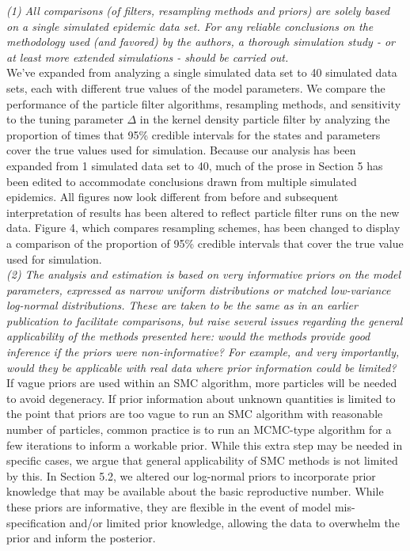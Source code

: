 \documentclass{article}
\begin{document}
\noindent \emph{(1) All comparisons (of filters, resampling methods and priors) are solely based on a single simulated epidemic data set. For any reliable conclusions on the methodology used (and favored) by the authors, a thorough simulation study - or at least more extended simulations - should be carried out.} \\

We've expanded from analyzing a single simulated data set to 40 simulated data sets, each with different true values of the model parameters. We compare the performance of the particle filter algorithms, resampling methods, and sensitivity to the tuning parameter $\Delta$ in the kernel density particle filter by analyzing the proportion of times that 95\% credible intervals for the states and parameters cover the true values used for simulation. Because our analysis has been expanded from 1 simulated data set to 40, much of the prose in Section 5 has been edited to accommodate conclusions drawn from multiple simulated epidemics. All figures now look different from before and subsequent interpretation of results has been altered to reflect particle filter runs on the new data. Figure 4, which compares resampling schemes, has been changed to display a comparison of the proportion of 95\% credible intervals that cover the true value used for simulation. \\

\noindent \emph{(2) The analysis and estimation is based on very informative priors on the model parameters, expressed as narrow uniform distributions or matched low-variance log-normal distributions. These are taken to be the same as in an earlier publication to facilitate comparisons, but raise several issues regarding the general applicability of the methods presented here: would the methods provide good inference if the priors were non-informative? For example, and very importantly, would they be applicable with real data where prior information could be limited?} \\

If vague priors are used within an SMC algorithm, more particles will be needed to avoid degeneracy. If prior information about unknown quantities is limited to the point that priors are too vague to run an SMC algorithm with reasonable number of particles, common practice is to run an MCMC-type algorithm for a few iterations to inform a workable prior. While this extra step may be needed in specific cases, we argue that general applicability of SMC methods is not limited by this. In Section 5.2, we altered our log-normal priors to incorporate prior knowledge that may be available about the basic reproductive number. While these priors are informative, they are flexible in the event of model mis-specification and/or limited prior knowledge, allowing the data to overwhelm the prior and inform the posterior. \\
\end{document}
